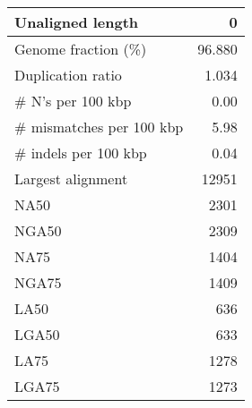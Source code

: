 \documentclass[12pt,a4paper]{article}
\begin{document}
\begin{table}[ht]
\begin{center}
\begin{tabular}{|l*{1}{|r}|}
Unaligned length & 0 \\ \hline
Genome fraction (\%) & 96.880 \\ \hline
Duplication ratio & 1.034 \\ \hline
\# N's per 100 kbp & 0.00 \\ \hline
\# mismatches per 100 kbp & 5.98 \\ \hline
\# indels per 100 kbp & 0.04 \\ \hline
Largest alignment & 12951 \\ \hline
NA50 & 2301 \\ \hline
NGA50 & 2309 \\ \hline
NA75 & 1404 \\ \hline
NGA75 & 1409 \\ \hline
LA50 & 636 \\ \hline
LGA50 & 633 \\ \hline
LA75 & 1278 \\ \hline
LGA75 & 1273 \\ \hline
\end{tabular}
\end{center}
\end{table}
\end{document}
